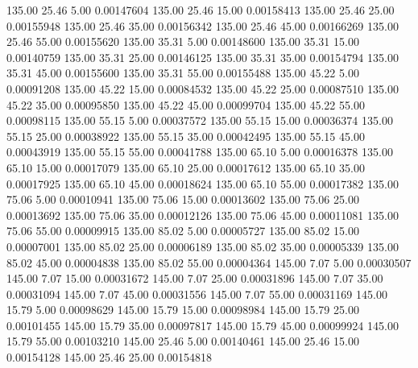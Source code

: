     135.00     25.46      5.00     0.00147604
    135.00     25.46     15.00     0.00158413
    135.00     25.46     25.00     0.00155948
    135.00     25.46     35.00     0.00156342
    135.00     25.46     45.00     0.00166269
    135.00     25.46     55.00     0.00155620
    135.00     35.31      5.00     0.00148600
    135.00     35.31     15.00     0.00140759
    135.00     35.31     25.00     0.00146125
    135.00     35.31     35.00     0.00154794
    135.00     35.31     45.00     0.00155600
    135.00     35.31     55.00     0.00155488
    135.00     45.22      5.00     0.00091208
    135.00     45.22     15.00     0.00084532
    135.00     45.22     25.00     0.00087510
    135.00     45.22     35.00     0.00095850
    135.00     45.22     45.00     0.00099704
    135.00     45.22     55.00     0.00098115
    135.00     55.15      5.00     0.00037572
    135.00     55.15     15.00     0.00036374
    135.00     55.15     25.00     0.00038922
    135.00     55.15     35.00     0.00042495
    135.00     55.15     45.00     0.00043919
    135.00     55.15     55.00     0.00041788
    135.00     65.10      5.00     0.00016378
    135.00     65.10     15.00     0.00017079
    135.00     65.10     25.00     0.00017612
    135.00     65.10     35.00     0.00017925
    135.00     65.10     45.00     0.00018624
    135.00     65.10     55.00     0.00017382
    135.00     75.06      5.00     0.00010941
    135.00     75.06     15.00     0.00013602
    135.00     75.06     25.00     0.00013692
    135.00     75.06     35.00     0.00012126
    135.00     75.06     45.00     0.00011081
    135.00     75.06     55.00     0.00009915
    135.00     85.02      5.00     0.00005727
    135.00     85.02     15.00     0.00007001
    135.00     85.02     25.00     0.00006189
    135.00     85.02     35.00     0.00005339
    135.00     85.02     45.00     0.00004838
    135.00     85.02     55.00     0.00004364
    145.00      7.07      5.00     0.00030507
    145.00      7.07     15.00     0.00031672
    145.00      7.07     25.00     0.00031896
    145.00      7.07     35.00     0.00031094
    145.00      7.07     45.00     0.00031556
    145.00      7.07     55.00     0.00031169
    145.00     15.79      5.00     0.00098629
    145.00     15.79     15.00     0.00098984
    145.00     15.79     25.00     0.00101455
    145.00     15.79     35.00     0.00097817
    145.00     15.79     45.00     0.00099924
    145.00     15.79     55.00     0.00103210
    145.00     25.46      5.00     0.00140461
    145.00     25.46     15.00     0.00154128
    145.00     25.46     25.00     0.00154818
